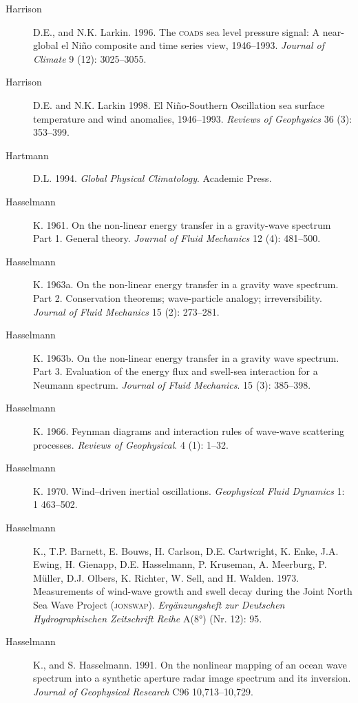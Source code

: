 \begin{description}
\item [Harrison]D.E., and N.K. Larkin. 1996. The \textsc{coads} sea
  level pressure signal: A near-global el Ni\~{n}o composite and time
  series view, 1946--1993.  \textit{Journal of Climate} 9 (12):
  3025--3055.

\item [Harrison]D.E. and N.K. Larkin 1998. El Ni\~{n}o-Southern
  Oscillation sea surface temperature and wind anomalies,
  1946--1993. \textit{Reviews of Geophysics} 36 (3): 353--399.

\item [Hartmann]D.L. 1994. \textit{Global Physical Climatology}.
  Academic Press.

\item[Hasselmann]K. 1961. On the non-linear energy transfer in a
  gravity-wave spectrum Part 1. General theory. \textit{Journal of
    Fluid Mechanics} 12 (4): 481--500.

\item[Hasselmann]K. 1963a. On the non-linear energy transfer in a
  gravity wave spectrum. Part 2. Conservation theorems; wave-particle
  analogy; irreversibility.  \textit{Journal of Fluid Mechanics} 15
  (2): 273--281.

\item[Hasselmann]K. 1963b. On the non-linear energy transfer in a
  gravity wave spectrum. Part 3. Evaluation of the energy flux and
  swell-sea interaction for a Neumann spectrum. \textit{Journal of
    Fluid Mechanics}. 15 (3): 385--398.

\item[Hasselmann]K. 1966. Feynman diagrams and interaction rules of
  wave-wave scattering processes. \textit{Reviews of Geophysical}. 4
  (1): 1--32.

\item [Hasselmann]K. 1970. Wind--driven inertial
  oscillations. \textit{Geophysical Fluid Dynamics} 1: 1 463--502.

\item [Hasselmann]K., T.P. Barnett, E. Bouws, H. Carlson,
  D.E. Cartwright, K.  Enke, J.A. Ewing, H. Gienapp, D.E. Hasselmann,
  P. Kruseman, A. Meerburg, P.  Müller, D.J. Olbers, K. Richter,
  W. Sell, and H. Walden. 1973. Measurements of wind-wave growth and
  swell decay during the Joint North Sea Wave Project
  (\textsc{jonswap}). \textit{Ergänzungsheft zur Deutschen
    Hydrographischen Zeitschrift Reihe} A(8°) (Nr. 12): 95.

\item [Hasselmann]K., and S. Hasselmann. 1991. On the nonlinear
  mapping of an ocean wave spectrum into a synthetic aperture radar
  image spectrum and its inversion. \textit{Journal of Geophysical
    Research} C96 10,713--10,729.


\end{description}
